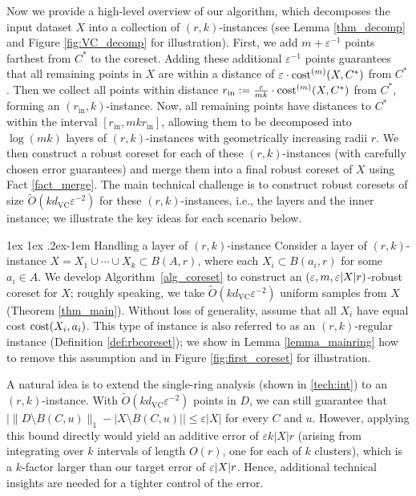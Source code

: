 \documentclass[11pt,letterpaper]{article}
\makeatletter
\renewcommand{\paragraph}{%
  \@startsection{paragraph}{4}%
  {\z@}{1ex \@plus 1ex \@minus .2ex}{-1em}%
  {\normalfont\normalsize\bfseries}%
}
\theoremstyle{definition}
\newcommand{\eps}{\varepsilon}
\renewcommand{\epsilon}{\varepsilon}
\newcommand{\VC}{\ensuremath{\mathrm{VC}}}
\newcommand{\inn}{{\mathrm{in}}}
\DeclarePairedDelimiter{\abs}{\lvert}{\rvert}
\makeatother
\begin{document}
Now we provide a high-level overview of our algorithm, which decomposes the input dataset $X$ into a collection of $(r,k)$-instances (see Lemma \ref{thm_decomp} and Figure \ref{fig:VC_decomp} for illustration).
%
First, we add $m + \eps^{-1}$ points farthest from $C^\ast$ to the coreset. 
%
Adding these additional $\eps^{-1}$ points guarantees that all remaining points in $X$ are within a distance of $\eps\cdot\cost[m](X,C^\ast)$ from $C^\ast$. 
%
Then we collect all points within distance $r_{\inn}:=\frac{\eps}{mk}\cdot \cost[m](X,C^\ast)$ from $C^\ast$, forming an $(r_{\inn},k)$-instance.
%
Now, all remaining points have distances to $C^\ast$ within the interval $[r_{\inn}, mk r_{\inn}]$, allowing them to be decomposed into $\log (mk)$ layers of $(r,k)$-instances with geometrically increasing radii $r$. 
%
We then construct a robust coreset for each of these \((r,k)\)-instances (with carefully chosen error guarantees) and merge them into a final robust coreset of \(X\) using Fact \ref{fact_merge}. 
%
The main technical challenge is to construct robust coresets of size \(\tilde{O}(k d_{\VC} \epsilon^{-2})\) for these \((r,k)\)-instances, i.e., the layers and the inner instance; we illustrate the key ideas for each scenario below.

\paragraph{Handling a layer of $(r,k)$-instance} 
Consider a layer of \((r,k)\)-instance \(X = X_1 \cup \cdots \cup X_k \subset B(A,r)\), where each \(X_i \subset B(a_i,r)\) for some \(a_i \in A\). 
%
We develop Algorithm~\ref{alg_coreset} to construct an \((\epsilon,m,\epsilon \abs{X} r)\)-robust coreset for \(X\); roughly speaking, we take \(\tilde{O}(k d_{\VC} \epsilon^{-2})\) uniform samples from \(X\) (Theorem \ref{thm_main}). 
%
Without loss of generality, assume that all \(X_i\) have equal cost \(\cost(X_i,a_i)\). 
%
This type of instance is also referred to as an \((r,k)\)-regular instance (Definition \ref{def:rbcoreset}); we show in Lemma \ref{lemma_mainring} how to remove this assumption and in Figure \ref{fig:first_coreset} for illustration.

A natural idea is to extend the single-ring analysis (shown in \eqref{tech:int}) to an \((r,k)\)-instance. 
%
With \(\tilde{O}(k d_{\VC} \epsilon^{-2})\) points in $D$, we can still guarantee that \(\bigl|\|D \setminus B(C,u)\|_1 - |X \setminus B(C,u)|\bigr| \le \epsilon |X|\) for every \(C\) and \(u\). 
%
However, applying this bound directly would yield an additive error of \(\epsilon k |X|r\) (arising from integrating over \(k\) intervals of length \(O(r)\), one for each of $k$ clusters), which is a $k$-factor larger than our target error of \(\epsilon \abs{X} r\). 
%
Hence, additional technical insights are needed for a tighter control of the error.
\end{document}
